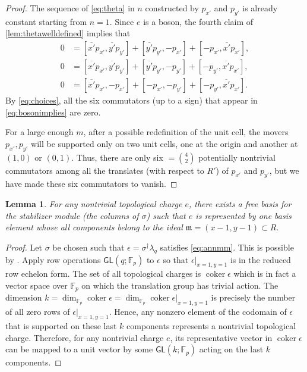 \documentclass[aps,pra,
floatfix,notitlepage,
nofootinbib,
longbibliography,11pt]{revtex4-1}
\newtheorem{lemma}{Lemma}[section]
\theoremstyle{definition}
\newcommand{\FF}{{\mathbb{F}}}
\DeclareMathOperator{\coker}{\mathrm{coker}}
\newcommand{\mm}{\mathfrak{m}}
\newcommand{\GL}{\mathsf{GL}}
\begin{document}
\begin{proof}
The sequence of \cref{eq:theta} in $n$ constructed by $p_{x'}$ and $p_{y'}$ 
is already constant starting from $n=1$.
Since $e$ is a boson, the fourth claim of \cref{lem:thetawelldefined} implies that
\begin{align}
0 &= [\overline{x'}p_{x'}, \overline{y'} p_{y'}]
 + [\overline{y'} p_{y'}, - p_{x'}]
 + [-p_{x'},\overline{x'}p_{x'}] ,\nonumber\\
0 &= [\overline{x'}p_{x'}, \overline{y'} p_{y'}] 
+ [\overline{y'} p_{y'}, -p_{y'}] 
+ [-p_{y'},\overline{x'}p_{x'}] , \label{eq:bosonimplies}\\
0 &= [\overline{x'}p_{x'},-p_{x'}] + [-p_{x'},-p_{y'}] + [-p_{y'}, \overline{x'}p_{x'}]. \nonumber
\end{align}
By \cref{eq:choices}, all the six commutators (up to a sign) 
that appear in \cref{eq:bosonimplies} are zero.


For a large enough $m$, after a possible redefinition of the unit cell,
the movers $p_{x'}, p_{y'}$ will be supported 
only on two unit cells, one at the origin and another at $(1,0)$ or $(0,1)$.
Thus, there are only six $=\binom{4}{2}$ potentially nontrivial commutators 
among all the translates (with respect to $R'$) of $p_{x'}$ and $p_{y'}$,
but we have made these six commutators to vanish.
\end{proof}

\begin{lemma}\label{lem:goodbasis}
For any nontrivial topological charge $e$,
there exists a free basis for the stabilizer module (the columns of $\sigma$)
such that $e$ is represented by one basis element 
whose all components belong to the ideal $\mm = (x-1,y-1) \subset R$.
\end{lemma}
\begin{proof}
Let $\sigma$ be chosen such that $\epsilon = \sigma^\dagger \lambda_q$ satisfies \cref{eq:annmm}.
This is possible by \cite[\S7 Thm.~4]{Haah2013}.
Apply row operations $\GL(q;\FF_p)$ to $\epsilon$ so that $\epsilon|_{x=1,y=1}$ 
is in the reduced row echelon form.
The set of all topological charges is $\coker \epsilon$ which is in fact a vector space over $\FF_p$
on which the translation group has trivial action.
The dimension $k = \dim_{\FF_p} \coker \epsilon = \dim_{\FF_p} \coker \epsilon|_{x=1,y=1}$
is precisely the number of all zero rows of $\epsilon|_{x=1,y=1}$.
Hence, any nonzero element of the codomain of $\epsilon$ that is supported on these last $k$ components
represents a nontrivial topological charge.
Therefore, for any nontrivial charge $e$, 
its representative vector in $\coker \epsilon$ can be mapped
to a unit vector by some $\GL(k;\FF_p)$ acting on the last $k$ components.
\end{proof}
\end{document}
